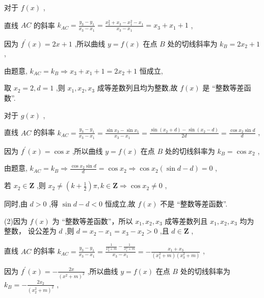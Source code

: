 \documentclass[10pt]{article}
\begin{document}
对于 \(f\left( x\right)\) ,

直线 \({AC}\) 的斜率 \({k}_{AC} = \frac{{y}_{3} - {y}_{1}}{{x}_{3} - {x}_{1}} = \frac{{x}_{3}^{2} + {x}_{3} - {x}_{1}^{2} - {x}_{1}}{{x}_{3} - {x}_{1}} = {x}_{3} + {x}_{1} + 1\) ,

因为 \({f}^{\prime }\left( x\right)  = {2x} + 1\) ,所以曲线 \(y = f\left( x\right)\) 在点 \(B\) 处的切线斜率为 \({k}_{B} = 2{x}_{2} + 1\) ,

由题意, \({k}_{AC} = {k}_{B} \Rightarrow  {x}_{3} + {x}_{1} + 1 = 2{x}_{2} + 1\) 恒成立,

取 \({x}_{2} = 2,d = 1\) ,则 \({x}_{1},{x}_{2},{x}_{3}\) 成等差数列且均为整数,故 \(f\left( x\right)\) 是 “整数等差函数”.

对于 \(g\left( x\right)\) ,

直线 \({AC}\) 的斜率 \({k}_{AC} = \frac{{y}_{3} - {y}_{1}}{{x}_{3} - {x}_{1}} = \frac{\sin {x}_{3} - \sin {x}_{1}}{{x}_{3} - {x}_{1}} = \frac{\sin \left( {{x}_{2} + d}\right)  - \sin \left( {{x}_{2} - d}\right) }{2d} = \frac{\cos {x}_{2}\sin d}{d}\) ,

因为 \({f}^{\prime }\left( x\right)  = \cos x\) ,所以曲线 \(y = f\left( x\right)\) 在点 \(B\) 处的切线斜率为 \({k}_{B} = \cos {x}_{2}\) ,

由题意, \({k}_{AC} = {k}_{B} \Rightarrow  \frac{\cos {x}_{2}\sin d}{d} = \cos {x}_{2} \Rightarrow  \cos {x}_{2}\left( {\sin d - d}\right)  = 0\) ,

若 \({x}_{2} \in  \mathbf{Z}\) ,则 \({x}_{2} \neq  \left( {k + \frac{1}{2}}\right) \pi ,k \in  \mathbf{Z} \Rightarrow  \cos {x}_{2} \neq  0\) ,

同时,由 \(d > 0\) ,得 \(\sin d - d < 0\) 恒成立,故 \(f\left( x\right)\) 不是 “整数等差函数”.

(2)因为 \(f\left( x\right)\) 为 “整数等差函数”，所以 \({x}_{1},{x}_{2},{x}_{3}\) 成等差数列且 \({x}_{1},{x}_{2},{x}_{3}\) 均为整数， 设公差为 \(d\) ,则 \(d = {x}_{2} - {x}_{1} = {x}_{3} - {x}_{2} > 0\) ,且 \(d \in  \mathbf{Z}\) ,

直线 \({AC}\) 的斜率 \({k}_{AC} = \frac{{y}_{3} - {y}_{1}}{{x}_{3} - {x}_{1}} = \frac{\frac{1}{{x}_{3}^{2} + m} - \frac{1}{{x}_{1}^{2} + m}}{{x}_{3} - {x}_{1}} =  - \frac{{x}_{1} + {x}_{3}}{\left( {{x}_{1}^{2} + m}\right) \left( {{x}_{3}^{2} + m}\right) }\) ,

因为 \({f}^{\prime }\left( x\right)  =  - \frac{2x}{{\left( {x}^{2} + m\right) }^{2}}\) ,所以曲线 \(y = f\left( x\right)\) 在点 \(B\) 处的切线斜率为 \({k}_{B} =  - \frac{2{x}_{2}}{{\left( {x}_{2}^{2} + m\right) }^{2}}\) ,
\end{document}
